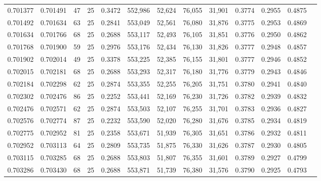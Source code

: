 \begin{tabular}{rrrrrrrrrrrrr}
0.701377 & 0.701491 &    47 &  25 &                                     0.3472 & 552,986 &  52,624 &  76,055 &  31,901 & 0.3774 & 0.2955 & 0.4875 \\
0.701492 & 0.701634 &    63 &  25 &                                     0.2841 & 553,049 &  52,561 &  76,080 &  31,876 & 0.3775 & 0.2953 & 0.4869 \\
0.701634 & 0.701766 &    68 &  25 &                                     0.2688 & 553,117 &  52,493 &  76,105 &  31,851 & 0.3776 & 0.2950 & 0.4862 \\
0.701768 & 0.701900 &    59 &  25 &                                     0.2976 & 553,176 &  52,434 &  76,130 &  31,826 & 0.3777 & 0.2948 & 0.4857 \\
0.701902 & 0.702014 &    49 &  25 &                                     0.3378 & 553,225 &  52,385 &  76,155 &  31,801 & 0.3777 & 0.2946 & 0.4852 \\
0.702015 & 0.702181 &    68 &  25 &                                     0.2688 & 553,293 &  52,317 &  76,180 &  31,776 & 0.3779 & 0.2943 & 0.4846 \\
0.702184 & 0.702298 &    62 &  25 &                                     0.2874 & 553,355 &  52,255 &  76,205 &  31,751 & 0.3780 & 0.2941 & 0.4840 \\
0.702302 & 0.702476 &    86 &  25 &                                     0.2252 & 553,441 &  52,169 &  76,230 &  31,726 & 0.3782 & 0.2939 & 0.4832 \\
0.702476 & 0.702571 &    62 &  25 &                                     0.2874 & 553,503 &  52,107 &  76,255 &  31,701 & 0.3783 & 0.2936 & 0.4827 \\
0.702576 & 0.702774 &    87 &  25 &                                     0.2232 & 553,590 &  52,020 &  76,280 &  31,676 & 0.3785 & 0.2934 & 0.4819 \\
0.702775 & 0.702952 &    81 &  25 &                                     0.2358 & 553,671 &  51,939 &  76,305 &  31,651 & 0.3786 & 0.2932 & 0.4811 \\
0.702952 & 0.703113 &    64 &  25 &                                     0.2809 & 553,735 &  51,875 &  76,330 &  31,626 & 0.3787 & 0.2930 & 0.4805 \\
0.703115 & 0.703285 &    68 &  25 &                                     0.2688 & 553,803 &  51,807 &  76,355 &  31,601 & 0.3789 & 0.2927 & 0.4799 \\
0.703286 & 0.703430 &    68 &  25 &                                     0.2688 & 553,871 &  51,739 &  76,380 &  31,576 & 0.3790 & 0.2925 & 0.4793 \\

\end{tabular}
